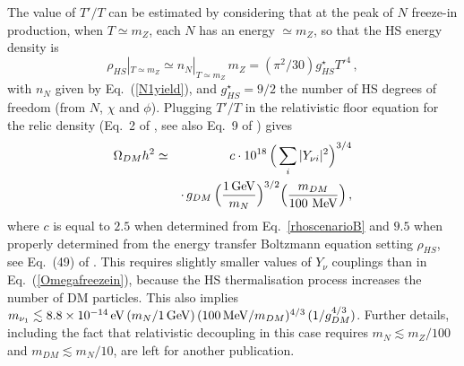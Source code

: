 \documentclass[prd,a4paper,twocolumn,preprintnumbers,nofootinbib,superscriptaddress]{revtex4}
\begin{document}
The value of $T'/T$ can be estimated by considering that at the peak of $N$ freeze-in production, when $T\simeq m_Z$, each $N$ has an energy $\simeq m_Z$, so that the HS energy density is
\begin{equation}
	\rho_{HS}|_{T\simeq m_Z} \simeq n_{N}|_{T\simeq m_Z}\, m_Z=(\pi^2/30)g^\star_{HS}T'^4 \, ,
	\label{rhoscenarioB}
\end{equation}
with $n_N$ given by Eq.~(\ref{N1yield}), and $g^\star_{HS} =9/2$ the number of HS degrees of freedom (from $N$, $\chi$ and $\phi$). Plugging $T'/T$ in the relativistic floor equation for the relic density (Eq.~2 of \cite{Hambye:2020lvy}, see also Eq.~9 of \cite{Hambye:2019tjt}) gives
\begin{eqnarray}
	\Omega_{DM}h^2 &\simeq&c \cdot 10^{18} \,\Big( \sum_i |Y_{\nu i}|^2 \Big)^{3/4} \nonumber \\
	&&  \cdot \,g_{DM}\,\Big( \frac{1\,{\rm GeV}}{m_N}\Big)^{3/2} \Big(\frac{m_{DM}}{100\hbox{ MeV}}\Big)  \, ,
\end{eqnarray}
where $c$ is equal to $2.5$ when determined from Eq.~\eqref{rhoscenarioB} and $9.5$ when properly determined from the energy transfer Boltzmann equation setting $\rho_{HS}$, see Eq.~(49) of \cite{Chu:2011be}. 
This requires slightly smaller values of $Y_\nu$ couplings than in Eq.~(\ref{Omegafreezein}), because the HS thermalisation process increases the number of DM particles. This also implies $m_{\nu_1} \lesssim 8.8 \times 10^{-14}\,\hbox{eV} \,(m_N/1\,\hbox{GeV})\, (100\, \hbox{MeV}/m_{DM})^{4/3}\,(1/g_{DM}^{4/3})$. 
Further details, including the fact that relativistic decoupling in this case requires $m_N\lesssim m_Z/100$ and $m_{DM}\lesssim m_N/10$, are left for another publication. %
	
	
	
\end{document}
